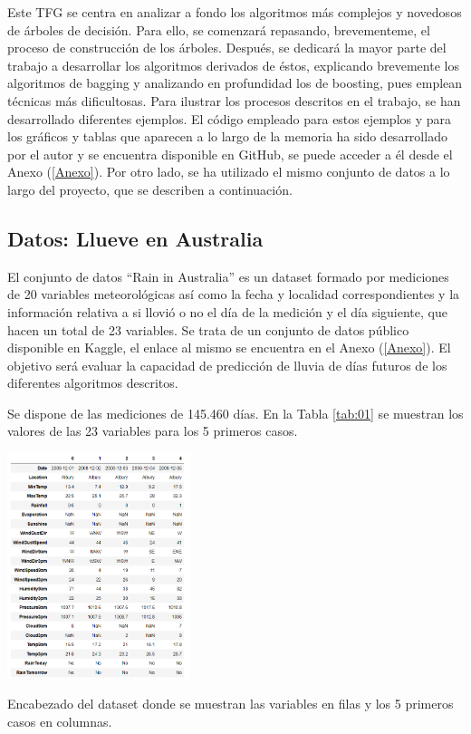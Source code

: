 \documentclass[12pt,twoside]{article}
\begin{document}
Este TFG se centra en analizar a fondo los algoritmos más complejos y novedosos de árboles de decisión. Para ello, se comenzará repasando, brevementeme, el proceso de construcción de los árboles. Después, se dedicará la mayor parte del trabajo a desarrollar los algoritmos derivados de éstos, explicando brevemente los algoritmos de bagging y analizando en profundidad los de boosting, pues emplean técnicas más dificultosas. Para ilustrar los procesos descritos en el trabajo, se han desarrollado diferentes ejemplos. El código empleado para estos ejemplos y para los gráficos y tablas que aparecen a lo largo de la memoria ha sido desarrollado por el autor y se encuentra disponible en GitHub, se puede acceder a él desde el Anexo (\ref{Anexo}). Por otro lado, se ha utilizado el mismo conjunto de datos a lo largo del proyecto, que se describen a continuación.



\subsection{Datos: Llueve en Australia} \label{sec: subsec11}

El conjunto de datos ``Rain in Australia'' es un dataset formado por mediciones de 20 variables meteorológicas así como la fecha y localidad correspondientes y la información relativa a si llovió o no el día de la medición y el día siguiente, que hacen un total de 23 variables. Se trata de un conjunto de datos público disponible en Kaggle, el enlace al mismo se encuentra en el Anexo (\ref{Anexo}). El objetivo será evaluar la capacidad de predicción de lluvia de días futuros de los diferentes algoritmos descritos.

Se dispone de las mediciones de 145.460 días. En la Tabla \ref{tab:01} se muestran los valores de las 23 variables para los 5 primeros casos.
\begin{table}[h]
	\centering
	\includegraphics[width = 0.4\textwidth]{Intro_01}
	\caption{Encabezado del dataset donde se muestran las variables en filas y los 5 primeros casos en columnas.}
	\label{tab:01}
\end{table}
\end{document}
